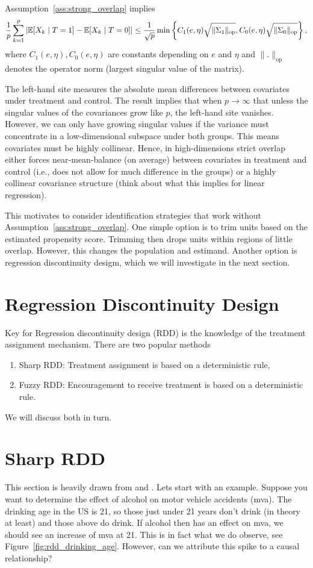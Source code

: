 \documentclass[11pt]{exam}
\begin{document}
\begin{theorem}
Assumption~\ref{ass:strong_overlap} implies
   \[
   \frac{1}{p} \sum_{k=1}^p |\mathbb{E}[X_k \mid T = 1] - \mathbb{E}[X_k \mid T = 0]| \leq \frac{1}{\sqrt{p}} \min \left \{C_1(e, \eta)  \sqrt{ \|\Sigma_1 \|_{\text{op}}}, C_0(e, \eta)  \sqrt{\|\Sigma_0 \|_{\text{op}}} \right\},
   \]
   where $C_1(e, \eta), C_0(e, \eta)$ are constants depending on $e$ and $\eta$ and $\|.\|_{\text{op}}$ denotes the operator norm (largest singular value of the matrix).
\end{theorem}
The left-hand site measures the absolute mean differences between covariates under treatment and control. The result implies that when $p \to \infty$ that unless the singular values of the covariances grow like $p$, the left-hand site vanishes. However, we can only have growing singular values if the variance must concentrate in a low-dimensional subspace under both groups. This means covariates must be highly collinear.
Hence, in high-dimensions strict overlap either forces near-mean-balance (on average) between covariates in treatment and control (i.e., does not allow for much difference in the groups) or a highly collinear covariance structure (think about what this implies for linear regression).

This motivates to consider identification strategies that work without Assumption~\ref{ass:strong_overlap}. One simple option is to trim units based on the estimated propensity score. Trimming then drops units within regions of little overlap. However, this changes the population and estimand. Another option is regression discontinuity desigm, which we will investigate in the next section.

\section{Regression Discontinuity Design}
Key for Regression discontinuity design (RDD) is the knowledge of the treatment assignment mechanism. There are two popular methods
\begin{enumerate}
    \item Sharp RDD: Treatment assignment is based on a deterministic rule,
    \item Fuzzy RDD: Encouragement to receive treatment is based on a deterministic rule.
\end{enumerate}
We will discuss both in turn. 
\section{Sharp RDD}
This section is heavily drawn from \citet[Section~20.2]{ding2023coursecausalinference} and \citet[Module~6]{chazal2024causalcoursenotes}.
Lets start with an example. Suppose you want to determine the effect of alcohol on motor vehicle accidents (mva). The drinking age in the US is 21, so those just under 21 years don't drink (in theory at least) and those above do drink. If alcohol then has an effect on mva, we should see an increase of mva at 21. This is in fact what we do observe, see Figure~\ref{fig:rdd_drinking_age}. However, can we attribute this spike to a causal relationship?
\end{document}
